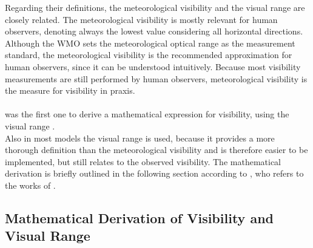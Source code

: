 Regarding their definitions, the meteorological visibility and the visual range are closely related. The meteorological visibility is mostly relevant for human observers, denoting always the lowest value considering all horizontal directions. Although the WMO sets the meteorological optical range as the measurement standard, the meteorological visibility is the recommended approximation for human observers, since it can be understood intuitively. Because most visibility measurements are still performed by human observers, meteorological visibility is the measure for visibility in praxis.\\ \\
\citeauthor{koschmeider1924theorie} was the first one to derive a mathematical expression for visibility, using the visual range \cite{koschmeider1924theorie}.\\
Also in most models the visual range is used, because it provides a more thorough definition than the meteorological visibility and is therefore easier to be implemented, but still relates to the observed visibility. The mathematical derivation is briefly outlined in the following section according to \citeauthor{price2007advanced} \cite{price2007advanced}, who refers to the works of \citeauthor{koschmeider1924theorie} \cite{koschmeider1924theorie}.

\subsection{Mathematical Derivation of Visibility and Visual Range}

